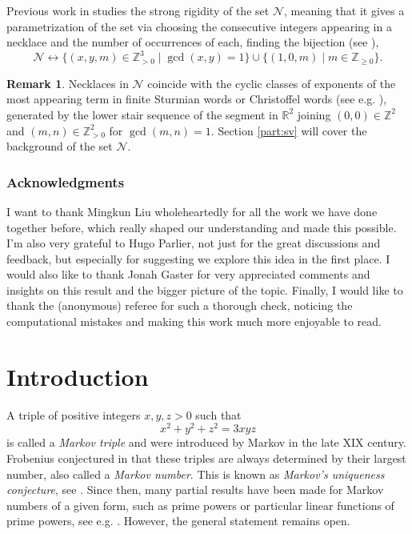 \documentclass[12pt,reqno]{amsart}
\numberwithin{equation}{part}
\theoremstyle{plain}
\theoremstyle{definition}
\newtheorem{remark}[theorem]{Remark}
\newcommand{\ZZ}{\mathbb{Z}}
\begin{document}
Previous work in \cite{FL24} studies the strong rigidity of the set $\mathcal{N}$, meaning that it gives a parametrization of the set via choosing the consecutive integers appearing in a necklace and the number of occurrences of each, finding the bijection (see \cite[Proposition~2.8]{FL24}),
\[\mathcal{N}\leftrightarrow\{(x,y,m)\in \ZZ_{>0}^3\mid \gcd(x,y)=1\}\cup\{(1,0,m)\mid m\in\ZZ_{\geq0}\}.\] 

\begin{remark}
    Necklaces in $\mathcal{N}$ coincide with the cyclic classes of exponents of the most appearing term in finite Sturmian words or Christoffel words (see e.g. \cite[Chapter 7]{Aig13}), generated by the lower stair sequence of the segment in $\mathbb{R}^2$ joining $(0,0)\in \ZZ^2$ and $(m,n)\in \ZZ_{>0}^2$ for $\gcd(m,n)=1$. Section \ref{part:sv} will cover the background of the set $\mathcal{N}$.
\end{remark}

\section*{Acknowledgments}
I want to thank Mingkun Liu wholeheartedly for all the work we have done together before, which really shaped our understanding and made this possible. I’m also very grateful to Hugo Parlier, not just for the great discussions and feedback, but especially for suggesting we explore this idea in the first place. I would also like to thank Jonah Gaster for very appreciated comments and insights on this result and the bigger picture of the topic. Finally, I would like to thank the (anonymous) referee for such a thorough check, noticing the computational mistakes and making this work much more enjoyable to read.

\part{Introduction}

A triple of positive integers $x,y,z>0$ such that \[
x^2+y^2+z^2=3xyz
\]
is called a \emph{Markov triple} and were introduced by Markov in the late XIX century. Frobenius conjectured in \cite{Fro13} that these triples are always determined by their largest number, also called a \emph{Markov number}. This is known as \emph{Markov's uniqueness conjecture}, see \cite{Aig13}. Since then, many partial results have been made for Markov numbers of a given form, such as prime powers or particular linear functions of prime powers, see e.g. \cite{Bar96,Zha07}. However, the general statement remains open.
\end{document}
